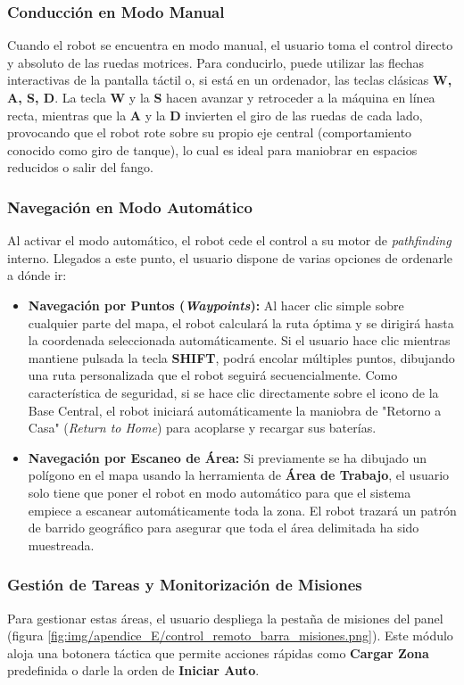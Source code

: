\subsubsection{Conducción en Modo Manual}
Cuando el robot se encuentra en modo manual, el usuario toma el control directo y absoluto de las ruedas motrices. Para conducirlo, puede utilizar las flechas interactivas de la pantalla táctil o, si está en un ordenador, las teclas clásicas \textbf{W, A, S, D}. La tecla \textbf{W} y la \textbf{S} hacen avanzar y retroceder a la máquina en línea recta, mientras que la \textbf{A} y la \textbf{D} invierten el giro de las ruedas de cada lado, provocando que el robot rote sobre su propio eje central (comportamiento conocido como giro de tanque), lo cual es ideal para maniobrar en espacios reducidos o salir del fango.

\subsubsection{Navegación en Modo Automático}
Al activar el modo automático, el robot cede el control a su motor de \textit{pathfinding} interno. Llegados a este punto, el usuario dispone de varias opciones de ordenarle a dónde ir:
\begin{itemize}
    \item \textbf{Navegación por Puntos (\textit{Waypoints}):} Al hacer clic simple sobre cualquier parte del mapa, el robot calculará la ruta óptima y se dirigirá hasta la coordenada seleccionada automáticamente. Si el usuario hace clic mientras mantiene pulsada la tecla \textbf{SHIFT}, podrá encolar múltiples puntos, dibujando una ruta personalizada que el robot seguirá secuencialmente. Como característica de seguridad, si se hace clic directamente sobre el icono de la Base Central, el robot iniciará automáticamente la maniobra de "Retorno a Casa" (\textit{Return to Home}) para acoplarse y recargar sus baterías.
    \item \textbf{Navegación por Escaneo de Área:} Si previamente se ha dibujado un polígono en el mapa usando la herramienta de \textbf{Área de Trabajo}, el usuario solo tiene que poner el robot en modo automático para que el sistema empiece a escanear automáticamente toda la zona. El robot trazará un patrón de barrido geográfico para asegurar que toda el área delimitada ha sido muestreada.
\end{itemize}

\subsubsection{Gestión de Tareas y Monitorización de Misiones}
Para gestionar estas áreas, el usuario despliega la pestaña de misiones del panel (figura \ref{fig:img/apendice_E/control_remoto_barra_misiones.png}). Este módulo aloja una botonera táctica que permite acciones rápidas como \textbf{Cargar Zona} predefinida o darle la orden de \textbf{Iniciar Auto}.

